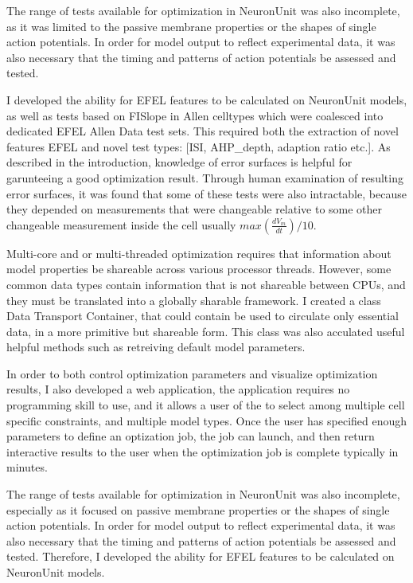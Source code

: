 The range of tests available for optimization in NeuronUnit was also incomplete, as it was limited to the passive membrane properties or the shapes of single action potentials.  In order for model output to reflect experimental data, it was also necessary that the timing and patterns of action potentials be assessed and tested. 

I developed the ability for EFEL features to be calculated on NeuronUnit models, as well as tests based on FISlope in Allen celltypes which were coalesced into dedicated EFEL Allen Data test sets. This required both the extraction of novel features EFEL and novel test types: [ISI, AHP\_depth, adaption ratio etc.]. As described in the introduction, knowledge of error surfaces is helpful for garunteeing a good optimization result. Through human examination of resulting error surfaces, it was found that some of these tests were also intractable, because they depended on measurements that were changeable relative to some other changeable measurement inside the cell usually $max(\frac{dV_{m}}{dt})/10$.

Multi-core and or multi-threaded optimization requires that information about model properties be shareable across various processor threads. However, some common data types contain information that is not shareable between CPUs, and they must be translated into a globally sharable framework. I created a class Data Transport Container, that could contain be used to circulate only essential data, in a more primitive but shareable form. This class was also acculated useful helpful methods such as retreiving default model parameters.

In order to both control optimization parameters and visualize optimization results, I also developed a web application, the application requires no programming skill to use, and it allows a user of the to select among multiple cell specific constraints, and multiple model types. Once the user has specified enough parameters to define an optization job, the job can launch, and then return interactive results to the user when the optimization job is complete typically in minutes.


The range of tests available for optimization in NeuronUnit was also incomplete, especially as it focused on passive membrane properties or the shapes of single action potentials.  In order for model output to reflect experimental data, it was also necessary that the timing and patterns of action potentials be assessed and tested.  Therefore, I developed the ability for EFEL features to be calculated on NeuronUnit models. 


